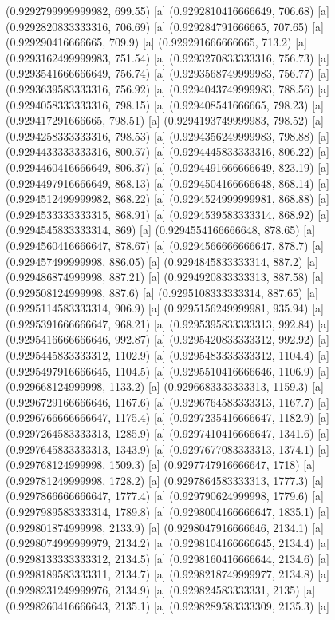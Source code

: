 {{{(0.9292799999999982, 699.55) [a] 
(0.9292810416666649, 706.68) [a] 
(0.9292820833333316, 706.69) [a] 
(0.929284791666665, 707.65) [a] 
(0.929290416666665, 709.9) [a] 
(0.929291666666665, 713.2) [a] 
(0.9293162499999983, 751.54) [a] 
(0.9293270833333316, 756.73) [a] 
(0.9293541666666649, 756.74) [a] 
(0.9293568749999983, 756.77) [a] 
(0.9293639583333316, 756.92) [a] 
(0.9294043749999983, 788.56) [a] 
(0.9294058333333316, 798.15) [a] 
(0.929408541666665, 798.23) [a] 
(0.929417291666665, 798.51) [a] 
(0.9294193749999983, 798.52) [a] 
(0.9294258333333316, 798.53) [a] 
(0.9294356249999983, 798.88) [a] 
(0.9294433333333316, 800.57) [a] 
(0.9294445833333316, 806.22) [a] 
(0.9294460416666649, 806.37) [a] 
(0.9294491666666649, 823.19) [a] 
(0.9294497916666649, 868.13) [a] 
(0.9294504166666648, 868.14) [a] 
(0.9294512499999982, 868.22) [a] 
(0.9294524999999981, 868.88) [a] 
(0.9294533333333315, 868.91) [a] 
(0.9294539583333314, 868.92) [a] 
(0.9294545833333314, 869) [a] 
(0.9294554166666648, 878.65) [a] 
(0.9294560416666647, 878.67) [a] 
(0.9294566666666647, 878.7) [a] 
(0.929457499999998, 886.05) [a] 
(0.9294845833333314, 887.2) [a] 
(0.929486874999998, 887.21) [a] 
(0.9294920833333313, 887.58) [a] 
(0.929508124999998, 887.6) [a] 
(0.9295108333333314, 887.65) [a] 
(0.9295114583333314, 906.9) [a] 
(0.9295156249999981, 935.94) [a] 
(0.9295391666666647, 968.21) [a] 
(0.9295395833333313, 992.84) [a] 
(0.9295416666666646, 992.87) [a] 
(0.9295420833333312, 992.92) [a] 
(0.9295445833333312, 1102.9) [a] 
(0.9295483333333312, 1104.4) [a] 
(0.9295497916666645, 1104.5) [a] 
(0.9295510416666646, 1106.9) [a] 
(0.929668124999998, 1133.2) [a] 
(0.9296683333333313, 1159.3) [a] 
(0.9296729166666646, 1167.6) [a] 
(0.9296764583333313, 1167.7) [a] 
(0.9296766666666647, 1175.4) [a] 
(0.9297235416666647, 1182.9) [a] 
(0.9297264583333313, 1285.9) [a] 
(0.9297410416666647, 1341.6) [a] 
(0.9297645833333313, 1343.9) [a] 
(0.9297677083333313, 1374.1) [a] 
(0.929768124999998, 1509.3) [a] 
(0.9297747916666647, 1718) [a] 
(0.929781249999998, 1728.2) [a] 
(0.9297864583333313, 1777.3) [a] 
(0.9297866666666647, 1777.4) [a] 
(0.929790624999998, 1779.6) [a] 
(0.9297989583333314, 1789.8) [a] 
(0.9298004166666647, 1835.1) [a] 
(0.929801874999998, 2133.9) [a] 
(0.9298047916666646, 2134.1) [a] 
(0.9298074999999979, 2134.2) [a] 
(0.9298104166666645, 2134.4) [a] 
(0.9298133333333312, 2134.5) [a] 
(0.9298160416666644, 2134.6) [a] 
(0.9298189583333311, 2134.7) [a] 
(0.9298218749999977, 2134.8) [a] 
(0.9298231249999976, 2134.9) [a] 
(0.929824583333331, 2135) [a] 
(0.9298260416666643, 2135.1) [a] 
(0.9298289583333309, 2135.3) [a] 
}}}
